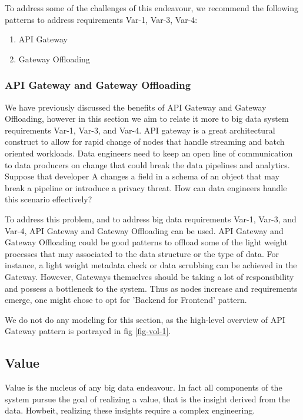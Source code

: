 \documentclass[conference]{IEEEtran}
\begin{document}
To address some of the challenges of this endeavour, we recommend the following patterns to address requirements Var-1, Var-3, Var-4: 

\begin{enumerate}
    \item API Gateway 
    \item Gateway Offloading
\end{enumerate}

\subsubsection{API Gateway and Gateway Offloading}

We have previously discussed the benefits of API Gateway and Gateway Offloading, however in this section we aim to relate it more to big data system requirements Var-1, Var-3, and Var-4. API gateway is a great architectural construct to allow for rapid change of nodes that handle streaming and batch oriented workloads. Data engineers need to keep an open line of communication to data producers on change that could break the data pipelines and analytics. Suppose that developer A changes a field in a schema of an object that may break a pipeline or introduce a privacy threat. How can data engineers handle this scenario effectively? 

To address this problem, and to address big data requirements Var-1, Var-3, and Var-4, API Gateway and Gateway Offloading can be used. API Gateway and Gateway Offloading could be good patterns to offload some of the light weight processes that may associated to the data structure or the type of data. For instance, a light weight metadata check or data scrubbing can be achieved in the Gateway. However, Gateways themselves should be taking a lot of responsibility and possess a bottleneck to the system. Thus as nodes increase and requirements emerge, one might chose to opt for 'Backend for Frontend' pattern.

We do not do any modeling for this section, as the high-level overview of API Gateway pattern is portrayed in fig \ref{fig-vol-1}.

\subsection{Value}

Value is the nucleus of any big data endeavour. In fact all components of the system pursue the goal of realizing a value, that is the insight derived from the data. Howbeit, realizing these insights require a complex engineering. 
\end{document}
